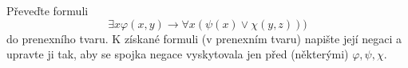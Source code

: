 \subsubsection{}
Převeďte formuli $$\exists x \varphi (x,y) \rightarrow \forall x(\psi(x)\vee
\chi (y,z)))$$ do prenexního tvaru. K získané formuli (v prenexním tvaru)
napište její negaci a upravte ji tak, aby se spojka negace vyskytovala jen před
(některými) $\varphi, \psi, \chi$.
